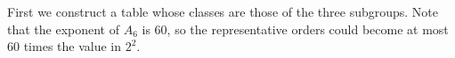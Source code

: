 %
%
%
%
%
%
%
%
%
%
%
%

First we  construct  a  table  whose  classes  are  those  of  the  three
subgroups.  Note that the exponent of $A_6$  is 60, so the representative
orders could become at most 60 times the value in $2^2$.

